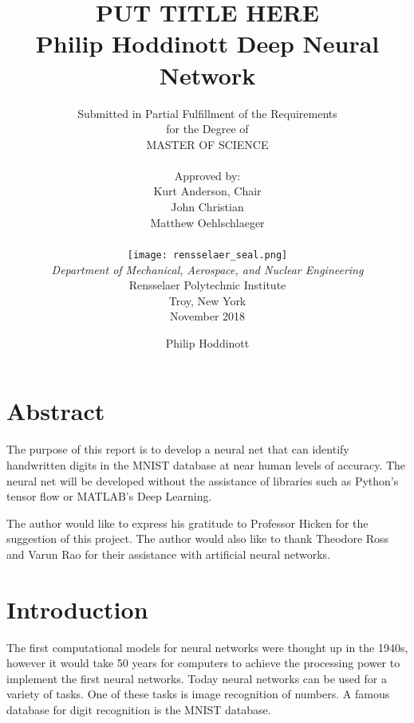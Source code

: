 \documentclass[12pt]{article}
\title{ 
		\LARGE \textbf{\uppercase{Put Title Here}} \\
		\vspace{0.25cm}
		\LARGE \textbf{Philip Hoddinott}
	}
\author{\small{Submitted in Partial Fulfillment of the Requirements} \\ \small{for the Degree of} \\
		\uppercase{Master of Science} \\ \\
		Approved by:
		\\ Kurt Anderson, Chair \\ John Christian \\ Matthew Oehlschlaeger \\ \\ %
		\texttt{[image: rensselaer\_seal.png]} \\
		\small{\textit{Department of Mechanical, Aerospace, and Nuclear Engineering}} \\
		\small{Rensselaer Polytechnic Institute} \\ 
		\small{Troy, New York} \\
		\small{November 2018}
	}
\begin{document}
	\clearpage
		\title{Deep Neural Network}
	\author{Philip Hoddinott}
	
	\maketitle


	


	
	



	
\tableofcontents
\listoffigures	
	\newpage
	\section*{Abstract}
	The purpose of this report is to develop a neural net that can identify handwritten digits in the MNIST database at near human levels of accuracy. The neural net will be developed without the assistance of libraries such as Python's tensor flow or MATLAB's Deep Learning.\par 
	The author would like to express his gratitude to Professor Hicken for the suggestion of this project. The author would also like to thank Theodore Ross and Varun Rao for their assistance with artificial neural networks.
	



	\section{Introduction}
	The first computational models for neural networks were thought up in the 1940s, however it would take 50 years for computers to achieve the processing power to implement the first neural networks. Today neural networks can be used for a variety of tasks. One of these tasks is image recognition of numbers. A famous database for digit recognition is the MNIST database.	
\end{document}
